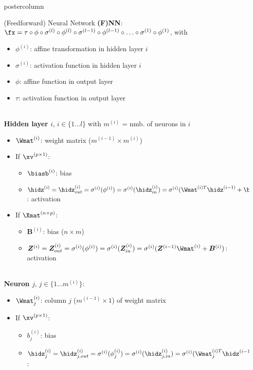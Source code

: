 \documentclass{beamer}
\begin{document}
\begin{frame}[fragile]{}
\begin{columns}
\begin{column}{.31\textwidth}
\begin{beamercolorbox}[center]{postercolumn}
\begin{minipage}{.98\textwidth}
{\begin{myblock}{(Feedforward) Neural Network}
\textbf{(F)NN}: $\fx = \tau \circ \phi \circ \sigma^{(l)} \circ \phi^{(l)} \circ \sigma^{(l-1)} \circ \phi^{(l-1)} \circ \ldots \circ \sigma^{(1)} \circ \phi^{(1)}$, with
\begin{itemize}
\item[] $\phi^{(i)}$: affine transformation in hidden layer $i$ 
\item[] $\sigma^{(i)}$: activation function in hidden layer $i$ 
\item[] $\phi$: affine function in output layer
\item[] $\tau$: activation function in output layer
\end{itemize}
\ \\
\textbf{Hidden layer $i$}, $i \in \{1 \dots l\}$ with $m^{(i)}$ = nmb. of neurons in $i$
\begin{itemize}
\item[] $\Wmat^{(i)}$: weight matrix ($m^{(i-1)} \times m^{(i)}$)
\item[] If $\xv^{(p \times 1)}$:
\begin{itemize} \normalsize
\item[] $\biasb^{(i)}$: bias
\item[] $\hidz^{(i)} = \hidz_{out}^{(i)} = \sigma^{(i)}(\phi^{(i)}) = \sigma^{(i)}(\hidz_{in}^{(i)}) = \sigma^{(i)}(\Wmat^{(i)T}\hidz^{(i - 1)} + \biasb^{(i)})$: activation
\end{itemize} 

\item[] If $\Xmat^{(n \times p)}$:
\begin{itemize}\normalsize
\item[] $\bm{B}^{(i)}$: bias ($n \times m$)
\item[] $\bm{Z}^{(i)} = \bm{Z}_{out}^{(i)} = \sigma^{(i)}(\phi^{(i)}) = \sigma^{(i)}(\bm{Z}_{in}^{(i)}) = \sigma^{(i)}(\bm{Z}^{(i-1)}\Wmat^{(i)} + \bm{B}^{(i)})$: activation
\end{itemize}
\end{itemize}
\ \\
\textbf{Neuron $j$}, $j \in \{1 \dots m^{(i)}\}$:
\begin{itemize}
\item[] $\Wmat^{(i)}_j$: column $j$ ($m^{(i-1)} \times 1$) of weight matrix
\item[] If $\xv^{(p \times 1)}$:
\begin{itemize} \normalsize
\item[] $b^{(i)}_j$: bias 
\item[] $\hidz^{(i)}_j = \hidz_{j,out}^{(i)} = \sigma^{(i)}(\phi^{(i)}_j) = \sigma^{(i)}(\hidz_{j,in}^{(i)}) = \sigma^{(i)}(\Wmat_j^{(i)T}\hidz^{(i - 1)} + b^{(i)}_j)$: 
\end{itemize} 


\end{itemize}
\end{myblock}}
\end{minipage}
\end{beamercolorbox}
\end{column}
\end{columns}
\end{frame}
\end{document}

